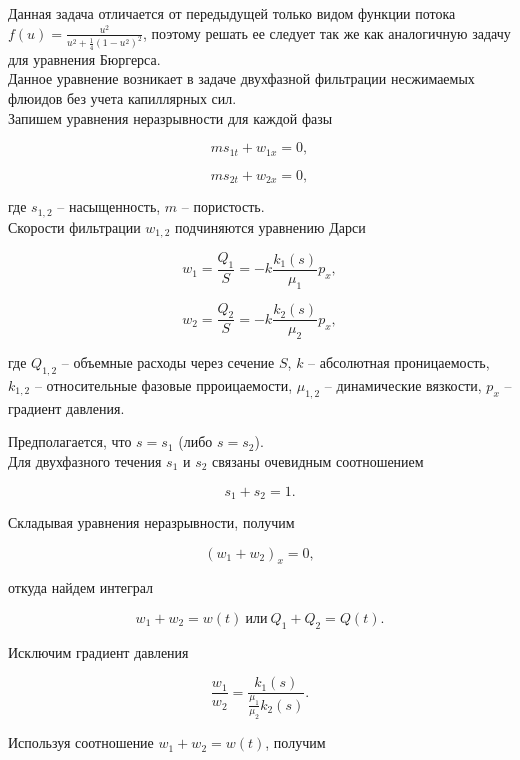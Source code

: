 \documentclass[12pt,a4paper]{article}
\begin{document}
		Данная задача отличается от передыдущей только видом функции потока $f \left( u \right) = \frac{u^{2}}{u^{2} + \frac{1}{4} \left( 1 - u^{2} \right)^{2}}$, поэтому решать ее следует так же как аналогичную задачу для уравнения Бюргерса.\\

		Данное уравнение возникает в задаче двухфазной фильтрации несжимаемых флюидов без учета капиллярных сил.\\

		Запишем уравнения неразрывности для каждой фазы

        \[
                m s_{1t} + w_{1x} = 0,
        \]

        \[
                m s_{2t} + w_{2x} = 0,
        \]

		где $s_{1,2}$ -- насыщенность, $m$ -- пористость.\\

		Скорости фильтрации $w_{1,2}$ подчиняются уравнению Дарси

        \[
                w_{1} = \frac{Q_{1}}{S} = - k \frac{k_{1}(s)}{\mu_{1}} p_{x},
        \]

        \[
                w_{2} = \frac{Q_{2}}{S} = - k \frac{k_{2}(s)}{\mu_{2}} p_{x},
        \]

		где $Q_{1,2}$ -- объемные расходы через сечение $S$, $k$ -- абсолютная проницаемость, $k_{1,2}$ -- относительные фазовые прроицаемости, $\mu_{1,2}$ -- динамические вязкости, $p_{x}$ -- градиент давления.

        Предполагается, что $s = s_{1}$ (либо $s = s_{2}$).\\

        Для двухфазного течения $s_{1}$ и $s_{2}$ связаны очевидным соотношением

        \[
                s_{1} + s_{2} = 1.
        \]

        Складывая уравнения неразрывности, получим

        \[
                \left( w_{1} + w_{2} \right)_{x} = 0,
        \]

        откуда найдем интеграл

        \[
                w_{1} + w_{2} = w(t) \: \mbox{или} \: Q_{1} + Q_{2} = Q(t).
        \]

		Исключим градиент давления

        \[
                \frac{w_{1}}{w_{2}} = \frac{k_{1}(s)}{\frac{\mu_{1}}{\mu_{2}} k_{2}(s)}.
        \]

        Используя соотношение $w_{1} + w_{2} = w(t)$, получим
\end{document}

